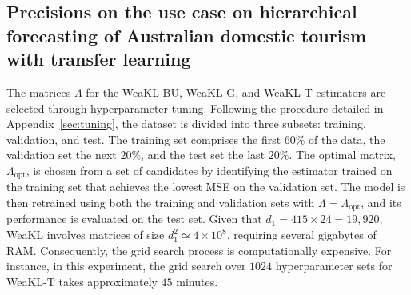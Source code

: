 \subsection{Precisions on the use case on hierarchical forecasting of Australian domestic tourism with transfer learning}
\label{sec:hierarchical_details} The matrices $\Lambda$ for the WeaKL-BU, WeaKL-G, and WeaKL-T estimators are selected through hyperparameter tuning. Following the procedure detailed in Appendix~\ref{sec:tuning}, the dataset is divided into three subsets: training, validation, and test. The training set comprises the first $60\%$ of the data, the validation set the next $20\%$, and the test set the last $20\%$. 
The optimal matrix, $\Lambda_{\mathrm{opt}}$, is chosen from a set of candidates by identifying the estimator trained on the training set that achieves the lowest MSE on the validation set. The model is then retrained using both the training and validation sets with $\Lambda = \Lambda_{\mathrm{opt}}$, and its performance is evaluated on the test set. Given that $d_1 = 415 \times 24 = 19,920$, WeaKL involves matrices of size $d_1^2 \simeq 4\times 10^8$, requiring several gigabytes of RAM. Consequently, the grid search process is computationally expensive. For instance, in this experiment, the grid search over $1024$ hyperparameter sets for WeaKL-T takes approximately $45$ minutes.